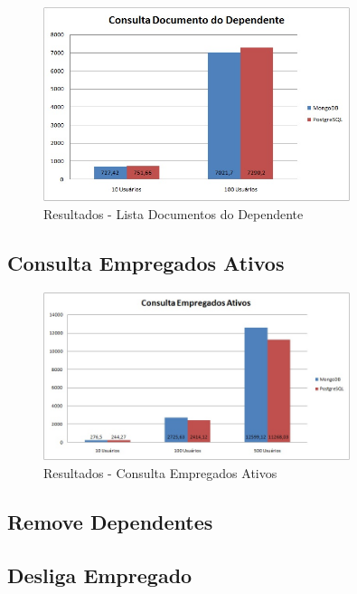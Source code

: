 \begin{figure}[!htbp]
	\begin{center}
		\includegraphics[width=0.8\textwidth]{resultados/consulta_doc_dependente}
	\end{center}
	\caption{Resultados - Lista Documentos do Dependente}
	\label{fig:resultlistadocdependente}
\end{figure}

\subsection{Consulta Empregados Ativos}

\begin{figure}[!htbp]
	\begin{center}
		\includegraphics[width=0.8\textwidth]{resultados/consulta_estatistica}
	\end{center}
	\caption{Resultados - Consulta Empregados Ativos}
	\label{fig:resultlistaempregadosativos}
\end{figure}

\subsection{Remove Dependentes}


\subsection{Desliga Empregado}


